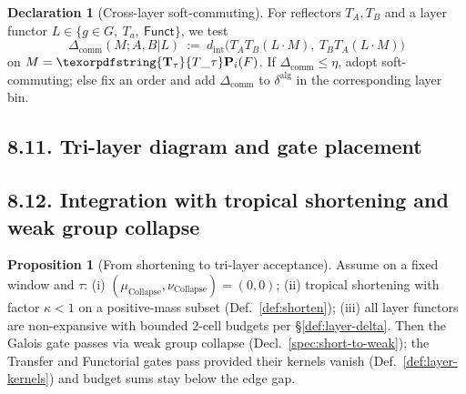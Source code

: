 \documentclass[11pt]{article}
\numberwithin{equation}{section}
\theoremstyle{plain}
\theoremstyle{definition}
\theoremstyle{remark}
\DeclareRobustCommand{\hyp}{\nobreakdash-}
\theoremstyle{plain}
\theoremstyle{definition}
\numberwithin{equation}{section}
\newtheorem{proposition}[theorem]{Proposition}
\theoremstyle{definition}
\newtheorem{declaration}[theorem]{Declaration}
\DeclareRobustCommand{\Ttau}{\texorpdfstring{\ensuremath{\mathbf{T}_{\tau}}}{T\_\tau}}
\numberwithin{equation}{section}
\theoremstyle{plain}
\theoremstyle{definition}
\theoremstyle{remark}
\newcommand{\Funct}{\mathsf{Funct}}
\providecommand{\Tfun}[1]{\mathbf{T}_{#1}}
\providecommand{\Ttau}{\Tfun{\tau}}
\begin{document}
\begin{declaration}[Cross-layer soft-commuting]\label{dec:cross-soft}
For reflectors \(T_A,T_B\) and a layer functor \(L\in\{g\in G,\ T_a,\ \Funct\}\),
we test
\[
\Delta_{\mathrm{comm}}(M;A,B|L)\ :=\ d_{\mathrm{int}}\!\big(T_A T_B (L\cdot M),\ T_B T_A (L\cdot M)\big)
\]
on \(M=\Ttau\mathbf{P}_i(F)\).
If \(\Delta_{\mathrm{comm}}\le \eta\), adopt soft\hyp commuting; else fix an order and add \(\Delta_{\mathrm{comm}}\) to \(\delta^{\mathrm{alg}}\) in the corresponding layer bin.
\end{declaration}

\subsection*{8.11. Tri-layer diagram and gate placement}
\begin{center}
\end{center}


\subsection*{8.12. Integration with tropical shortening and weak group collapse}
\begin{proposition}[From shortening to tri-layer acceptance]\label{prop:short-trilayer}
Assume on a fixed window and \(\tau\):
(i) \((\mu_{\mathrm{Collapse}},\nu_{\mathrm{Collapse}})=(0,0)\);
(ii) tropical shortening with factor \(\kappa<1\) on a positive\hyp mass subset (Def.~\ref{def:shorten});
(iii) all layer functors are non\hyp expansive with bounded \(2\)\hyp cell budgets per §\ref{def:layer-delta}.
Then the Galois gate passes via weak group collapse (Decl.~\ref{spec:short-to-weak}); the Transfer and Functorial gates pass provided their kernels vanish (Def.~\ref{def:layer-kernels}) and budget sums stay below the edge gap.
\end{proposition}
\end{document}
